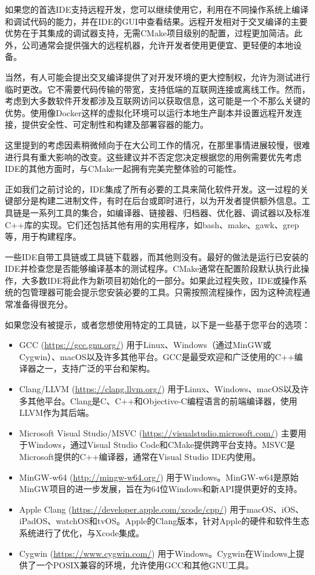 如果您的首选IDE支持远程开发，您可以继续使用它，利用在不同操作系统上编译和调试代码的能力，并在IDE的GUI中查看结果。远程开发相对于交叉编译的主要优势在于其集成的调试器支持，无需CMake项目级别的配置，过程更加简洁。此外，公司通常会提供强大的远程机器，允许开发者使用更便宜、更轻便的本地设备。

当然，有人可能会提出交叉编译提供了对开发环境的更大控制权，允许为测试进行临时更改。它不需要代码传输的带宽，支持低端的互联网连接或离线工作。然而，考虑到大多数软件开发都涉及互联网访问以获取信息，这可能是一个不那么关键的优势。使用像Docker这样的虚拟化环境可以运行本地生产副本并设置远程开发连接，提供安全性、可定制性和构建及部署容器的能力。

这里提到的考虑因素稍微倾向于在大公司工作的情况，在那里事情进展较慢，很难进行具有重大影响的改变。这些建议并不否定您决定根据您的用例需要优先考虑IDE的其他方面时，与CMake一起拥有完美完整体验的可能性。


正如我们之前讨论的，IDE集成了所有必要的工具来简化软件开发。这一过程的关键部分是构建二进制文件，有时在后台或即时进行，以为开发者提供额外信息。工具链是一系列工具的集合，如编译器、链接器、归档器、优化器、调试器以及标准C++库的实现。它们还包括其他有用的实用程序，如bash、make、gawk、grep等，用于构建程序。

一些IDE自带工具链或工具链下载器，而其他则没有。最好的做法是运行已安装的IDE并检查您是否能够编译基本的测试程序。CMake通常在配置阶段默认执行此操作，大多数IDE将此作为新项目初始化的一部分。如果此过程失败，IDE或操作系统的包管理器可能会提示您安装必要的工具。只需按照流程操作，因为这种流程通常准备得很充分。

如果您没有被提示，或者您想使用特定的工具链，以下是一些基于您平台的选项：

\begin{itemize}
\item
GCC (\url{https://gcc.gnu.org/}) 用于Linux、Windows（通过MinGW或Cygwin）、macOS以及许多其他平台。GCC是最受欢迎和广泛使用的C++编译器之一，支持广泛的平台和架构。

\item
Clang/LLVM (\url{https://clang.llvm.org/}) 用于Linux、Windows、macOS以及许多其他平台。Clang是C、C++和Objective-C编程语言的前端编译器，使用LLVM作为其后端。

\item
Microsoft Visual Studio/MSVC (\url{https://visualstudio.microsoft.com/}) 主要用于Windows，通过Visual Studio Code和CMake提供跨平台支持。MSVC是Microsoft提供的C++编译器，通常在Visual Studio IDE内使用。

\item
MinGW-w64 (\url{http://mingw-w64.org/}) 用于Windows。MinGW-w64是原始MinGW项目的进一步发展，旨在为64位Windows和新API提供更好的支持。

\item
Apple Clang (\url{https://developer.apple.com/xcode/cpp/}) 用于macOS、iOS、iPadOS、watchOS和tvOS。Apple的Clang版本，针对Apple的硬件和软件生态系统进行了优化，与Xcode集成。

\item
Cygwin (\url{https://www.cygwin.com/}) 用于Windows。Cygwin在Windows上提供了一个POSIX兼容的环境，允许使用GCC和其他GNU工具。
\end{itemize}

